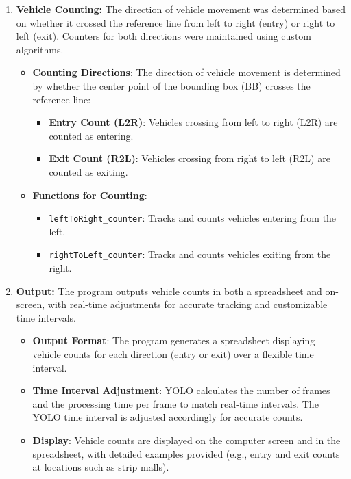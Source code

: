 {\begin{enumerate}
\begin{itemize}
  \end{itemize}
  \item \textbf{Vehicle Counting:} The direction of vehicle movement was determined based on whether it crossed the reference line from left to right (entry) or right to left (exit). Counters for both directions were maintained using custom algorithms.
  \begin{itemize}
    \item \textbf{Counting Directions}: The direction of vehicle movement is determined by whether the center point of the bounding box (BB) crosses the reference line:
    \begin{itemize}
        \item \textbf{Entry Count (L2R)}: Vehicles crossing from left to right (L2R) are counted as entering.
        \item \textbf{Exit Count (R2L)}: Vehicles crossing from right to left (R2L) are counted as exiting.
    \end{itemize}
    \item \textbf{Functions for Counting}:
    \begin{itemize}
        \item \texttt{leftToRight\_counter}: Tracks and counts vehicles entering from the left.
        \item \texttt{rightToLeft\_counter}: Tracks and counts vehicles exiting from the right.
    \end{itemize}
  \end{itemize}
  \item \textbf{Output:} The program outputs vehicle counts in both a spreadsheet and on-screen, with real-time adjustments for accurate tracking and customizable time intervals.
  \begin{itemize}
    \item \textbf{Output Format}: The program generates a spreadsheet displaying vehicle counts for each direction (entry or exit) over a flexible time interval.
    \item \textbf{Time Interval Adjustment}: YOLO calculates the number of frames and the processing time per frame to match real-time intervals. The YOLO time interval is adjusted accordingly for accurate counts.
    \item \textbf{Display}: Vehicle counts are displayed on the computer screen and in the spreadsheet, with detailed examples provided (e.g., entry and exit counts at locations such as strip malls).

\end{itemize}
\end{enumerate}}
